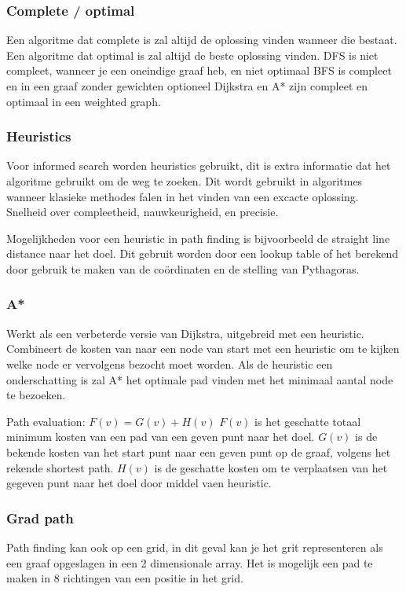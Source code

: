 \subsubsection{Complete / optimal}
Een algoritme dat complete is zal altijd de oplossing vinden wanneer die bestaat.
Een algoritme dat optimal is zal altijd de beste oplossing vinden.
DFS is niet compleet, wanneer je een oneindige graaf heb, en niet optimaal
BFS is compleet en in een graaf zonder gewichten optioneel
Dijkstra en A* zijn compleet en optimaal in een weighted graph.

\subsubsection{Heuristics}
Voor informed search worden heuristics gebruikt, dit is extra informatie dat het algoritme gebruikt om de weg te zoeken.
Dit wordt gebruikt in algoritmes wanneer klasieke methodes falen in het vinden van een excacte oplossing.
Snelheid over compleetheid, nauwkeurigheid, en precisie.

Mogelijkheden voor een heuristic in path finding is bijvoorbeeld de straight line distance naar het doel.
Dit gebruit worden door een lookup table of het berekend door gebruik te maken van de coördinaten en de stelling van Pythagoras.

\subsubsection{A*}
Werkt als een verbeterde versie van Dijkstra, uitgebreid met een heuristic.
Combineert de kosten van naar een node van start met een heuristic om te kijken welke node er vervolgens bezocht moet worden.
Als de heuristic een onderschatting is zal A* het optimale pad vinden met het minimaal aantal node te bezoeken.

Path evaluation:
$F(v) = G(v) + H(v)$
$F(v)$ is het geschatte totaal minimum kosten van een pad van een geven punt naar het doel.
$G(v)$ is de bekende kosten van het start punt naar een geven punt op de graaf, volgens het rekende shortest path.
$H(v)$ is de geschatte kosten om te verplaatsen van het gegeven punt naar het doel door middel vaen heuristic.

\subsubsection{Grad path}
Path finding kan ook op een grid, in dit geval kan je het grit representeren als een graaf opgeslagen in een 2 dimensionale array.
Het is mogelijk een pad te maken in 8 richtingen van een positie in het grid.
